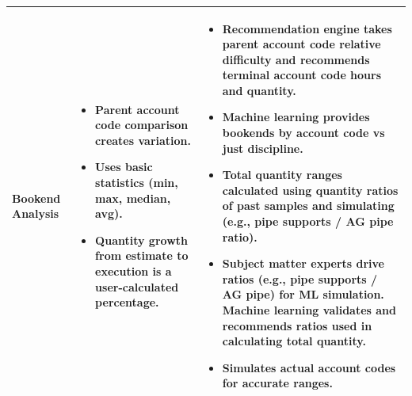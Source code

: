 \documentclass[12pt, a4paper]{article} %
\begin{document}
\begin{table}[h!]
\begin{tabularx}{\textwidth}{@{}
  >{\raggedright\arraybackslash\relax}p{2.5cm}
  X 
  X
@{}}
\textbf{Bookend Analysis} &
\vspace*{-\topsep}\vspace{\parskip}
\begin{itemize}[leftmargin=*, nosep]
  \item Parent account code comparison creates variation.
  \item Uses basic statistics (min, max, median, avg).
  \item Quantity growth from estimate to execution is a user-calculated percentage.
\end{itemize} 
\vspace*{-\topsep}\vspace{\parskip}&
\vspace*{-\topsep}\vspace{\parskip}
\begin{itemize}[leftmargin=*, nosep]
  \item Recommendation engine takes parent account code relative difficulty and recommends terminal account code hours and quantity.
  \item Machine learning provides bookends by account code vs just discipline.
  \item Total quantity ranges calculated using quantity ratios of past samples and simulating (e.g., pipe supports / AG pipe ratio).
  \item Subject matter experts drive ratios (e.g., pipe supports / AG pipe) for ML simulation. Machine learning validates and recommends ratios used in calculating total quantity.
  \item Simulates actual account codes for accurate ranges.
\end{itemize} 
\vspace*{-\topsep}\vspace{\parskip}\\

\midrule


\end{tabularx}
\end{table}
\end{document}

